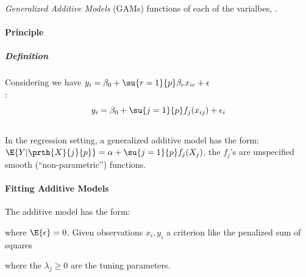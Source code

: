 \emph{Generalized Additive Models} (GAMs) 
functions of each of the varialbes, .

\paragraph{Principle}
\subparagraph{Definition}
Considering we have $y_{i}=\beta_{0}+\su{{r=1}}{p}\beta_{r}x_{ir}+
\epsilon$\\ :\\
$$
y_{i}=\beta_{0}+\su{{j=1}}{p}f_{j}(x_{ij})+\epsilon_{i}
$$
\\
In the regression setting, a generalized additive model has the form: 
$\E{Y|\prth{X}{j}{p}}=\alpha+\su{{j=1}}{p}f_{j}(X_{j})$, the $f_{j}$'s are unspecified smooth
(``non-parametric'') functions.
\paragraph{Fitting Additive Models}
The additive model has the form:
\begin{center}
\end{center}
where $\E{\epsilon}=0$. Given observations $x_{i},y_{i}$ a criterion like the penalized sum of
squares
\begin{center}
\end{center}
where the $\lambda_{j}\geq 0$ are the tuning parameters.

